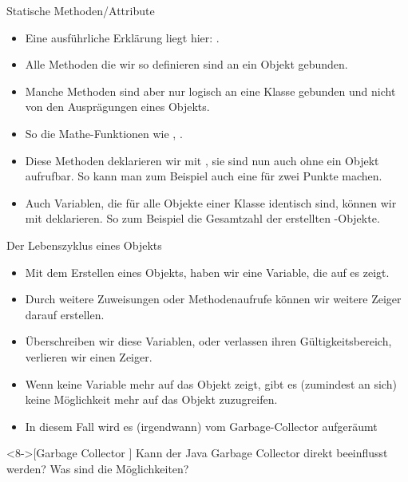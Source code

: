 \begin{frame}[fragile]{Statische Methoden/Attribute}
\begin{itemize}[<+(1)->]
    \item<1-> Eine ausführliche Erklärung liegt hier: .
    \item Alle Methoden die wir so definieren sind an ein Objekt gebunden.
    \item Manche Methoden sind aber nur logisch an eine Klasse gebunden\pause{} und nicht von den Ausprägungen eines Objekts.
    \item So die Mathe-Funktionen wie , .
    \item Diese Methoden deklarieren wir mit ,\pause{} sie sind nun auch ohne ein Objekt aufrufbar.\pause{} So kann man zum Beispiel auch eine  für zwei Punkte machen.
    \item Auch Variablen, die für alle Objekte einer Klasse identisch sind,\pause{} können wir mit  deklarieren.\pause{} So zum Beispiel die Gesamtzahl der erstellten -Objekte.
\end{itemize}
\end{frame}

\begin{frame}[fragile]{Der Lebenszyklus eines Objekts}
    \begin{itemize}[<+(1)->]
        \item Mit dem Erstellen eines Objekts,\pause{} haben wir eine Variable, die auf es zeigt.
        \item Durch weitere Zuweisungen\pause{} oder Methodenaufrufe können wir weitere Zeiger darauf erstellen.
        \item Überschreiben wir diese Variablen, oder verlassen ihren Gültigkeitsbereich,\pause{} verlieren wir einen Zeiger.
        \item Wenn keine Variable mehr auf das Objekt zeigt,\pause{} gibt es (zumindest an sich) keine Möglichkeit mehr auf das Objekt zuzugreifen.
        \item In diesem Fall wird es (irgendwann) vom Garbage-Collector aufgeräumt
    \end{itemize}
\ifull
    \begin{exercise}<8->[Garbage Collector ]
        \pause{}Kann der Java Garbage Collector direkt beeinflusst werden? Was sind die Möglichkeiten?
    \end{exercise}
\fi{}
\end{frame}

